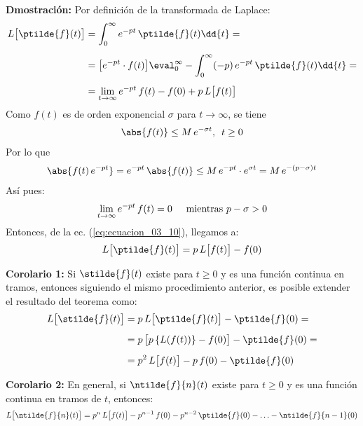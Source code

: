 \noindent \textbf{Dmostración:} Por definición de la transformada de Laplace:
\begin{align}
\begin{aligned}[b]
L \big[\ptilde{f}(t)\big] &= \int_{0}^{\infty} e^{-p t} \, \ptilde{f} (t) \dd{t} = \\[0.5em]
&= \big[e^{-p t} \cdot f(t)\big] \eval_{0}^{\infty} - \int_{0}^{\infty} (-p) \, e^{-p t} \, \ptilde{f} (t) \dd{t} = \\[0.5em]
&= \lim_{t \to \infty} e^{-p t} \, f(t) - f(0) + p \, L \big[f(t)\big]
\end{aligned}
\label{eq:ecuacion_03_10}
\end{align}
Como $f(t)$ es de orden exponencial $\sigma$ para $t \to \infty$, se tiene
\begin{align*}
\abs{f(t)} \leq M \, e^{-\sigma t}, \hspace{0.5em} t \geq 0
\end{align*}
Por lo que
\begin{align*}
\abs{f(t) \, e^{-p t}} = e^{-p t} \, \abs{f(t)} \leq M \, e^{-p t} \cdot e^{\sigma t} = M \, e^{-(p - \sigma) t}
\end{align*}
Así pues:
\begin{align*}
\lim_{t \to \infty} e^{-p t} \, f(t) = 0 \hspace{0.5cm} \mbox{mientras  } p - \sigma > 0
\end{align*}
Entonces, de la ec. (\ref{eq:ecuacion_03_10}), llegamos a:
\begin{align}
L \big[\ptilde{f}(t)\big] = p \, L \big[f(t)\big] - f(0)
\label{eq:ecuacion_03_11}
\end{align}

\noindent \textbf{Corolario 1: } Si $\stilde{f}(t)$ existe para $t \geq 0$ y es una función continua en tramos, entonces siguiendo el mismo procedimiento anterior, es posible extender el resultado del teorema como:
\begin{align}
\begin{aligned}[b]
L \big[\stilde{f}(t)\big] &= p \, L \big[\ptilde{f}(t)\big] - \ptilde{f}(0) = \\[0.5em]
&= p \, \big[p \left\{ L (f(t)) \right\} - f(0) \big] - \ptilde{f} (0) = \\[0.5em]
&= p^{2} \, L \big[f(t)\big] - p \, f(0) - \ptilde{f}(0)
\end{aligned}
\label{eq:ecuacion_03_12}
\end{align}

\noindent \textbf{Corolario 2:} En general, si $\ntilde{f}{n}(t)$ existe para $t \geq 0$ y es una función continua en tramos de $t$, entonces:
\begin{align}
L \big[\ntilde{f}{n}(t)\big] = p^{n} \, L \big[f(t)\big] - p^{n-1} \, f(0) - p^{n-2} \, \ptilde{f}(0) - \ldots - \ntilde{f}{n-1} (0)
\label{eq:ecuacion_03_13}
\end{align}


